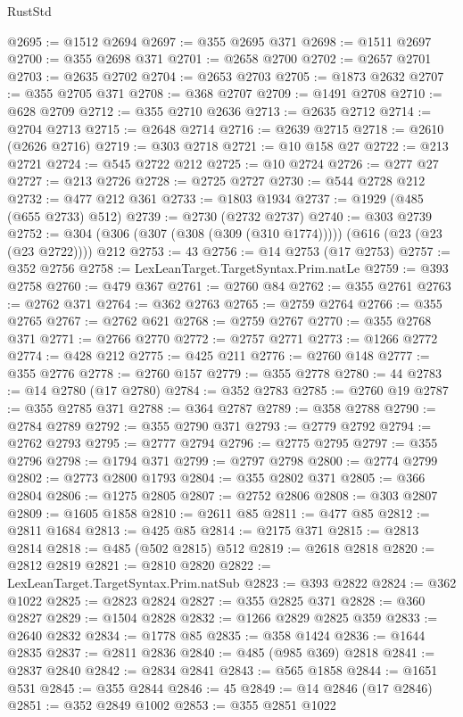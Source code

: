 \begin{lexlean}{RustStd}
\begin{coremodule}
@2695 := @1512 @2694
@2697 := @355 @2695 @371
@2698 := @1511 @2697
@2700 := @355 @2698 @371
@2701 := @2658 @2700
@2702 := @2657 @2701
@2703 := @2635 @2702
@2704 := @2653 @2703
@2705 := @1873 @2632
@2707 := @355 @2705 @371
@2708 := @368 @2707
@2709 := @1491 @2708
@2710 := @628 @2709
@2712 := @355 @2710 @2636
@2713 := @2635 @2712
@2714 := @2704 @2713
@2715 := @2648 @2714
@2716 := @2639 @2715
@2718 := @2610 (@2626 @2716)
@2719 := @303 @2718
@2721 := @10 @158 @27
@2722 := @213 @2721
@2724 := @545 @2722 @212
@2725 := @10 @2724
@2726 := @277 @27
@2727 := @213 @2726
@2728 := @2725 @2727
@2730 := @544 @2728 @212
@2732 := @477 @212 @361
@2733 := @1803 @1934
@2737 := @1929 (@485 (@655 @2733) @512)
@2739 := @2730 (@2732 @2737)
@2740 := @303 @2739
@2752 := @304 (@306 (@307 (@308 (@309 (@310 @1774))))) (@616 (@23 (@23 (@23 @2722)))) @212
@2753 := 43
@2756 := @14 @2753 (@17 @2753)
@2757 := @352 @2756
@2758 := LexLeanTarget.TargetSyntax.Prim.natLe
@2759 := @393 @2758
@2760 := @479 @367
@2761 := @2760 @84
@2762 := @355 @2761
@2763 := @2762 @371
@2764 := @362 @2763
@2765 := @2759 @2764
@2766 := @355 @2765
@2767 := @2762 @621
@2768 := @2759 @2767
@2770 := @355 @2768 @371
@2771 := @2766 @2770
@2772 := @2757 @2771
@2773 := @1266 @2772
@2774 := @428 @212
@2775 := @425 @211
@2776 := @2760 @148
@2777 := @355 @2776
@2778 := @2760 @157
@2779 := @355 @2778
@2780 := 44
@2783 := @14 @2780 (@17 @2780)
@2784 := @352 @2783
@2785 := @2760 @19
@2787 := @355 @2785 @371
@2788 := @364 @2787
@2789 := @358 @2788
@2790 := @2784 @2789
@2792 := @355 @2790 @371
@2793 := @2779 @2792
@2794 := @2762 @2793
@2795 := @2777 @2794
@2796 := @2775 @2795
@2797 := @355 @2796
@2798 := @1794 @371
@2799 := @2797 @2798
@2800 := @2774 @2799
@2802 := @2773 @2800 @1793
@2804 := @355 @2802 @371
@2805 := @366 @2804
@2806 := @1275 @2805
@2807 := @2752 @2806
@2808 := @303 @2807
@2809 := @1605 @1858
@2810 := @2611 @85
@2811 := @477 @85
@2812 := @2811 @1684
@2813 := @425 @85
@2814 := @2175 @371
@2815 := @2813 @2814
@2818 := @485 (@502 @2815) @512
@2819 := @2618 @2818
@2820 := @2812 @2819
@2821 := @2810 @2820
@2822 := LexLeanTarget.TargetSyntax.Prim.natSub
@2823 := @393 @2822
@2824 := @362 @1022
@2825 := @2823 @2824
@2827 := @355 @2825 @371
@2828 := @360 @2827
@2829 := @1504 @2828
@2832 := @1266 @2829 @2825 @359
@2833 := @2640 @2832
@2834 := @1778 @85
@2835 := @358 @1424
@2836 := @1644 @2835
@2837 := @2811 @2836
@2840 := @485 (@985 @369) @2818
@2841 := @2837 @2840
@2842 := @2834 @2841
@2843 := @565 @1858
@2844 := @1651 @531
@2845 := @355 @2844
@2846 := 45
@2849 := @14 @2846 (@17 @2846)
@2851 := @352 @2849 @1002
@2853 := @355 @2851 @1022

\end{coremodule}
\end{lexlean}
